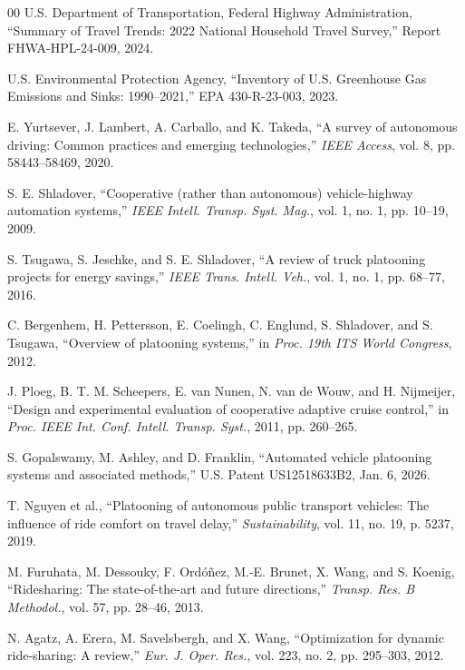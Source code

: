 \documentclass[sigconf]{acmart}
\begin{document}
\begin{thebibliography}{00}
 U.S. Department of Transportation, Federal Highway Administration, ``Summary of Travel Trends: 2022 National Household Travel Survey,'' Report FHWA-HPL-24-009, 2024.

 U.S. Environmental Protection Agency, ``Inventory of U.S. Greenhouse Gas Emissions and Sinks: 1990--2021,'' EPA 430-R-23-003, 2023.

 E. Yurtsever, J. Lambert, A. Carballo, and K. Takeda, ``A survey of autonomous driving: Common practices and emerging technologies,'' \textit{IEEE Access}, vol. 8, pp. 58443--58469, 2020.

 S. E. Shladover, ``Cooperative (rather than autonomous) vehicle-highway automation systems,'' \textit{IEEE Intell. Transp. Syst. Mag.}, vol. 1, no. 1, pp. 10--19, 2009.

 S. Tsugawa, S. Jeschke, and S. E. Shladover, ``A review of truck platooning projects for energy savings,'' \textit{IEEE Trans. Intell. Veh.}, vol. 1, no. 1, pp. 68--77, 2016.

 C. Bergenhem, H. Pettersson, E. Coelingh, C. Englund, S. Shladover, and S. Tsugawa, ``Overview of platooning systems,'' in \textit{Proc. 19th ITS World Congress}, 2012.

 J. Ploeg, B. T. M. Scheepers, E. van Nunen, N. van de Wouw, and H. Nijmeijer, ``Design and experimental evaluation of cooperative adaptive cruise control,'' in \textit{Proc. IEEE Int. Conf. Intell. Transp. Syst.}, 2011, pp. 260--265.

 S. Gopalswamy, M. Ashley, and D. Franklin, ``Automated vehicle platooning systems and associated methods,'' U.S. Patent US12518633B2, Jan. 6, 2026.

 T. Nguyen et al., ``Platooning of autonomous public transport vehicles: The influence of ride comfort on travel delay,'' \textit{Sustainability}, vol. 11, no. 19, p. 5237, 2019.

 M. Furuhata, M. Dessouky, F. Ord{\'o}{\~n}ez, M.-E. Brunet, X. Wang, and S. Koenig, ``Ridesharing: The state-of-the-art and future directions,'' \textit{Transp. Res. B Methodol.}, vol. 57, pp. 28--46, 2013.

 N. Agatz, A. Erera, M. Savelsbergh, and X. Wang, ``Optimization for dynamic ride-sharing: A review,'' \textit{Eur. J. Oper. Res.}, vol. 223, no. 2, pp. 295--303, 2012.


\end{thebibliography}
\end{document}
